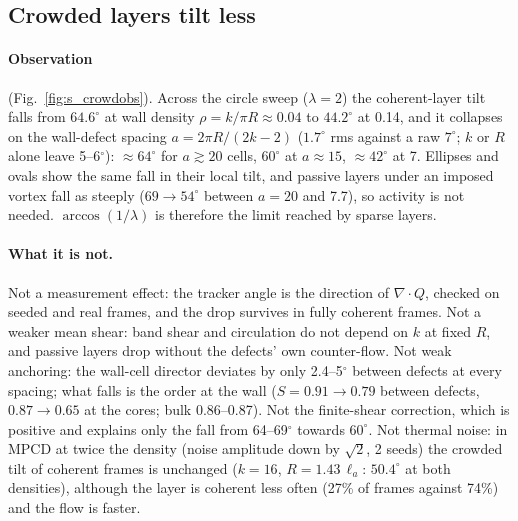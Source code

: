 \documentclass[aps,prl,onecolumn,superscriptaddress,amsmath,amssymb,nofootinbib]{revtex4-2}
\newcommand{\la}{\ell_a}
\begin{document}
\subsection{Crowded layers tilt less}
\paragraph{Observation} (Fig.~\ref{fig:s_crowdobs}). Across the circle sweep ($\lambda=2$) the coherent-layer tilt falls from $64.6^\circ$ at wall density $\rho=k/\pi R\approx0.04$ to
$44.2^\circ$ at 0.14, and it collapses on the wall-defect spacing $a=2\pi R/(2k-2)$ ($1.7^\circ$ rms against a raw $7^\circ$; $k$ or $R$ alone leave 5--6$^\circ$): $\approx64^\circ$ for
$a\gtrsim20$ cells, $60^\circ$ at $a\approx15$, $\approx42^\circ$ at 7. Ellipses and ovals show the same fall in their local tilt, and passive layers under an imposed vortex fall as
steeply ($69\to54^\circ$ between $a=20$ and 7.7), so activity is not needed. $\arccos(1/\lambda)$ is therefore the limit reached by sparse layers.

\paragraph{What it is not.} Not a measurement effect: the tracker angle is the direction of $\nabla\!\cdot Q$, checked on seeded and real frames, and the drop survives in fully
coherent frames. Not a weaker mean shear: band shear and circulation do not depend on $k$ at fixed $R$, and passive layers drop without the defects' own counter-flow. Not weak
anchoring: the wall-cell director deviates by only 2.4--5$^\circ$ between defects at every spacing; what falls is the order at the wall ($S=0.91\to0.79$ between defects, $0.87\to0.65$ at
the cores; bulk 0.86--0.87). Not the finite-shear correction, which is positive and explains only the fall from 64--69$^\circ$ towards $60^\circ$. Not thermal noise: in MPCD at twice the
density (noise amplitude down by $\sqrt2$, 2 seeds) the crowded tilt of coherent frames is unchanged ($k=16$, $R=1.43\,\la$: $50.4^\circ$ at both densities), although the layer is
coherent less often (27\% of frames against 74\%) and the flow is faster.
\end{document}
